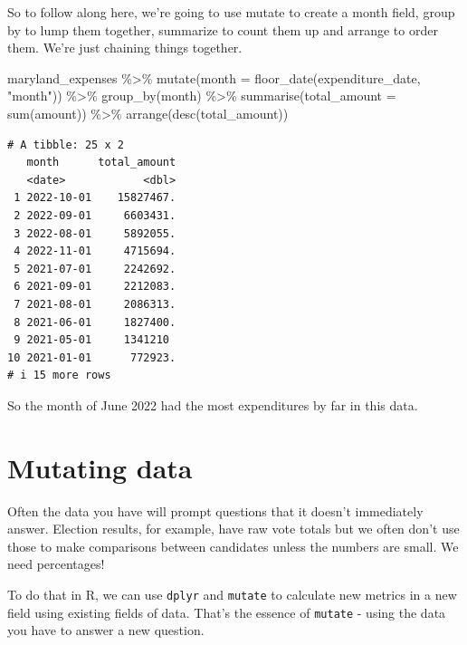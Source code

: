 \documentclass[
  letterpaper,
  DIV=11,
  numbers=noendperiod]{scrreprt}
\newenvironment{Shaded}{\begin{snugshade}}{\end{snugshade}}
\newcommand{\AttributeTok}[1]{\textcolor[rgb]{0.40,0.45,0.13}{#1}}
\newcommand{\FunctionTok}[1]{\textcolor[rgb]{0.28,0.35,0.67}{#1}}
\newcommand{\NormalTok}[1]{\textcolor[rgb]{0.00,0.23,0.31}{#1}}
\newcommand{\SpecialCharTok}[1]{\textcolor[rgb]{0.37,0.37,0.37}{#1}}
\newcommand{\StringTok}[1]{\textcolor[rgb]{0.13,0.47,0.30}{#1}}
\begin{document}
So to follow along here, we're going to use mutate to create a month
field, group by to lump them together, summarize to count them up and
arrange to order them. We're just chaining things together.

\begin{Shaded}
\begin{Highlighting}[]
\NormalTok{maryland\_expenses }\SpecialCharTok{\%\textgreater{}\%}
  \FunctionTok{mutate}\NormalTok{(}\AttributeTok{month =} \FunctionTok{floor\_date}\NormalTok{(expenditure\_date, }\StringTok{"month"}\NormalTok{)) }\SpecialCharTok{\%\textgreater{}\%}
  \FunctionTok{group\_by}\NormalTok{(month) }\SpecialCharTok{\%\textgreater{}\%}
  \FunctionTok{summarise}\NormalTok{(}\AttributeTok{total\_amount =} \FunctionTok{sum}\NormalTok{(amount)) }\SpecialCharTok{\%\textgreater{}\%}
  \FunctionTok{arrange}\NormalTok{(}\FunctionTok{desc}\NormalTok{(total\_amount))}
\end{Highlighting}
\end{Shaded}

\begin{verbatim}
# A tibble: 25 x 2
   month      total_amount
   <date>            <dbl>
 1 2022-10-01    15827467.
 2 2022-09-01     6603431.
 3 2022-08-01     5892055.
 4 2022-11-01     4715694.
 5 2021-07-01     2242692.
 6 2021-09-01     2212083.
 7 2021-08-01     2086313.
 8 2021-06-01     1827400.
 9 2021-05-01     1341210 
10 2021-01-01      772923.
# i 15 more rows
\end{verbatim}

So the month of June 2022 had the most expenditures by far in this data.


\hypertarget{mutating-data}{%
\chapter{Mutating data}\label{mutating-data}}

Often the data you have will prompt questions that it doesn't
immediately answer. Election results, for example, have raw vote totals
but we often don't use those to make comparisons between candidates
unless the numbers are small. We need percentages!

To do that in R, we can use \texttt{dplyr} and \texttt{mutate} to
calculate new metrics in a new field using existing fields of data.
That's the essence of \texttt{mutate} - using the data you have to
answer a new question.
\end{document}
